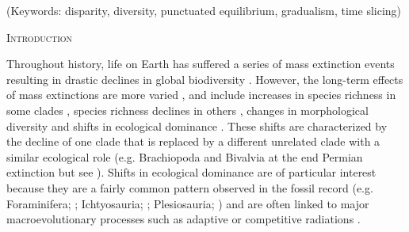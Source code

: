 \documentclass[12pt,letterpaper]{article}
\renewcommand{\section}[1]{%
\bigskip
\begin{center}
\begin{Large}
\normalfont\scshape #1
\medskip
\end{Large}
\end{center}}
\begin{document}
\noindent (Keywords: disparity, diversity, punctuated equilibrium, gradualism, time slicing)\\
\vspace{1.5in}

\newpage 

%
%

\section{Introduction}
Throughout history, life on Earth has suffered a series of mass extinction events resulting in drastic declines in global biodiversity \citep[e.g.][]{RaupPT,BentonPT,rennetime2013,Brusatte2015}.
However, the long-term effects of mass extinctions are more varied \citep{Erwin1998344}, and include increases in species richness in some clades \citep{friedmanexplosive2010}, species richness declines in others \citep{Benton85}, changes in morphological diversity \citep{Ciampaglio2001,Ciampaglio2004,kornextinction2013} and shifts in ecological dominance \citep[e.g.][]{Brusatte12092008,toljagictriassic-jurassic2013,bensonfaunal2014}.
These shifts are characterized by the decline of one clade that is replaced by a different unrelated clade with a similar ecological role (e.g. Brachiopoda and Bivalvia at the end Permian extinction \citealt{Sepkiski1981,CLAPHAM01102006} but see \citealt{Payne22052014}). 
Shifts in ecological dominance are of particular interest because they are a fairly common pattern observed in the fossil record (e.g. Foraminifera; \citealt{D'Hondt01011996,Coxall01042006}; Ichtyosauria; \citealt{thorneresetting2011}; Plesiosauria; \citealt{bensonfaunal2014}) and are often linked to major macroevolutionary processes such as adaptive \citep{Losos2010} or competitive radiations \citep{Brusatte12092008}.
\end{document}
